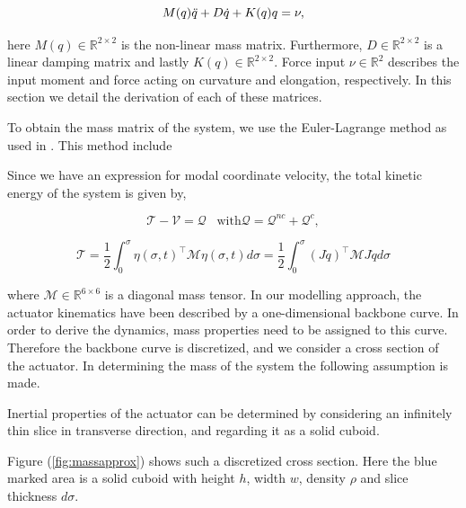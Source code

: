 \begin{equation}
    M(q)\Ddot{q} + D\dot{q} + K(q)q = \nu,
    \label{eq2:simp_model}
\end{equation}


here $M(q) \in \mathbb{R}^{2\times 2}$ is the non-linear mass matrix. Furthermore, $D \in \mathbb{R}^{2\times2}$ is a linear damping matrix and lastly $K(q) \in \mathbb{R}^{2\times 2}$. Force input $\nu \in \mathbb{R}^2$ describes the input moment and force acting on curvature and elongation, respectively. In this section we detail the derivation of each of these matrices. 

To obtain the mass matrix of the system, we use the Euler-Lagrange method as used in \cite{Caasenbrood2020}. This method include

Since we have an expression for modal coordinate velocity, the total kinetic energy of the system is given by,

\begin{equation}
\mathcal{T} - \mathcal{V} = \mathcal{Q} \hspace{10pt} \text{with} \mathcal{Q} = \mathcal{Q}^{nc} + \mathcal{Q}^c,    
\end{equation}




\begin{equation}
    \mathcal{T} = \frac{1}{2}\int_0^{\sigma} \eta(\sigma,t)^\top \mathcal{M} \eta(\sigma,t) d \sigma  = \frac{1}{2}\int_0^{\sigma} (J \dot{q})^\top \mathcal{M} J\dot{q} d \sigma
    \label{eq2:T}
\end{equation}

where $\mathcal{M} \in \mathbb{R}^{6\times6}$ is a diagonal mass tensor. In our modelling approach, the actuator kinematics have been described by a one-dimensional backbone curve. In order to derive the dynamics, mass properties need to be assigned to this curve. Therefore the backbone curve is discretized, and we consider a cross section of the actuator. In determining the mass of the system the following assumption is made. 

\begin{theorem}
Inertial properties of the actuator can be determined by considering an infinitely thin slice in transverse direction, and regarding it as a solid cuboid.
\end{theorem}


Figure (\ref{fig:massapprox}) shows such a discretized cross section. Here the blue marked area is a solid cuboid with height $h$, width $w$, density $\rho$ and slice thickness $d\sigma$. 

